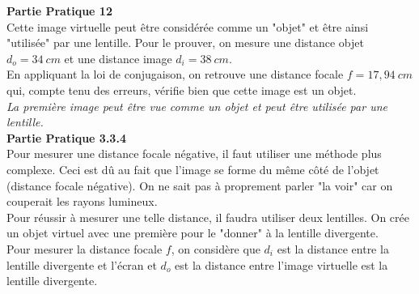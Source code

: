 \documentclass	[11pt, a4paper, openany]{book}
\begin{document}
\textbf{Partie Pratique 12}\\
Cette image virtuelle peut être considérée comme un "objet" et être ainsi "utilisée" par une lentille. Pour le prouver, on mesure une distance objet $d_o = 34\ cm$ et une distance image $d_i = 38\ cm$.\\
En appliquant la loi de conjugaison, on retrouve une distance focale $f = 17,94\ cm$ qui, compte tenu des erreurs, vérifie bien que cette image est un objet.\\
\textit{La première image peut être vue comme un objet et peut être utilisée  par une lentille.}\\

\textbf{Partie Pratique 3.3.4}\\
Pour mesurer une distance focale négative, il faut utiliser une méthode plus complexe. Ceci est dû au fait que l'image se forme du même côté de l'objet (distance focale négative). On ne sait pas à proprement parler "la voir" car on couperait les rayons lumineux.\\
Pour réussir à mesurer une telle distance, il faudra utiliser deux lentilles. On crée un objet virtuel avec une première pour le "donner" à la lentille divergente.\\

Pour mesurer la distance focale $f$, on considère que $d_i$ est la distance entre la lentille divergente et l'écran et $d_o$ est la distance entre  l'image virtuelle est la lentille divergente.\\
\end{document}
